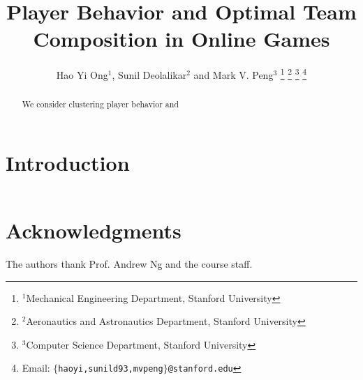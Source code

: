 \documentclass[letterpaper,10 pt,conference]{ieeeconf}
\title{\LARGE \bf
Player Behavior and Optimal Team Composition in Online Games
}
\author{Hao Yi Ong$^{1}$, 
        Sunil Deolalikar$^{2}$ and 
        Mark V. Peng$^{3}$%
\thanks{$^{1}$Mechanical Engineering Department, 
        Stanford University}%
\thanks{$^{2}$Aeronautics and Astronautics Department, 
        Stanford University}%
\thanks{$^{3}$Computer Science Department, 
        Stanford University}%
\thanks{Email: {\tt\small $\{$haoyi,sunild93,mvpeng$\}$@stanford.edu}}
}
\begin{document}
\maketitle
\thispagestyle{empty}
\pagestyle{empty}

\begin{abstract} %

We consider clustering player behavior and  

\end{abstract}

\section{Introduction}

\[
  
\]

\section*{Acknowledgments}
The authors thank Prof. Andrew Ng and the course staff.


\end{document}
